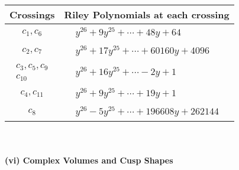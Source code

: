 \documentclass[1p]{elsarticle_modified}
\theoremstyle{definition}
\begin{document}
\begin{tabular}{m{50pt}|m{274pt}}
Crossings & \hspace{64pt}Riley Polynomials at each crossing \\
\hline $$\begin{aligned}c_{1},c_{6}\end{aligned}$$&$\begin{aligned}
&y^{26}+9 y^{25}+\cdots+48 y+64
\end{aligned}$\\
\hline $$\begin{aligned}c_{2},c_{7}\end{aligned}$$&$\begin{aligned}
&y^{26}+17 y^{25}+\cdots+60160 y+4096
\end{aligned}$\\
\hline $$\begin{aligned}c_{3},c_{5},c_{9}\\c_{10}\end{aligned}$$&$\begin{aligned}
&y^{26}+16 y^{25}+\cdots-2 y+1
\end{aligned}$\\
\hline $$\begin{aligned}c_{4},c_{11}\end{aligned}$$&$\begin{aligned}
&y^{26}+9 y^{25}+\cdots+19 y+1
\end{aligned}$\\
\hline $$\begin{aligned}c_{8}\end{aligned}$$&$\begin{aligned}
&y^{26}-5 y^{25}+\cdots+196608 y+262144
\end{aligned}$\\
\hline
\end{tabular}\\~\\
\newpage\flushleft \textbf{(vi) Complex Volumes and Cusp Shapes}
\end{document}
